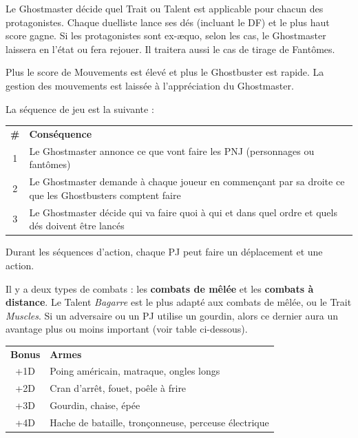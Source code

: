 \begin{frame}[b]
{%
}
{
\myindent Le Ghostmaster décide quel Trait ou Talent est applicable pour chacun des protagonistes. Chaque duelliste lance ses dés (incluant le DF) et le plus haut score gagne. Si les protagonistes sont ex-æquo, selon les cas, le Ghostmaster laissera en l'état ou fera rejouer. Il traitera aussi le cas de tirage de Fantômes.


\myindent Plus le score de Mouvements est élevé et plus le Ghostbuster est rapide. La gestion des mouvements est laissée à l'appréciation du Ghostmaster.


\myindent La séquence de jeu est la suivante :

\begin{center}
\begin{tabular}{c p{7.5cm}}
\textbf{\#} & \textbf{Conséquence}\\
1 & Le Ghostmaster annonce ce que vont faire les PNJ (personnages ou fantômes) \\
2 & Le Ghostmaster demande à chaque joueur en commençant par sa droite ce que les Ghostbusters comptent faire \\
3 & Le Ghostmaster décide qui va faire quoi à qui et dans quel ordre et quels dés doivent être lancés \\
\end{tabular}
\end{center}

\myindent Durant les séquences d'action, chaque PJ peut faire un déplacement et une action.


\myindent Il y a deux types de combats : les \textbf{combats de mêlée} et les \textbf{combats à distance}. Le Talent \textit{Bagarre} est le plus adapté aux combats de mêlée, ou le Trait \textit{Muscles}. Si un adversaire ou un PJ utilise un gourdin, alors ce dernier aura un avantage plus ou moins important (voir table ci-dessous).

\begin{center}
\begin{tabular}{c p{6.5cm}}
\textbf{Bonus} & \textbf{Armes}\\
+1D & Poing américain, matraque, ongles longs \\
+2D & Cran d'arrêt, fouet, poêle à frire \\
+3D & Gourdin, chaise, épée \\
+4D & Hache de bataille, tronçonneuse, perceuse électrique \\
\end{tabular}
\end{center}

}
\end{frame}
